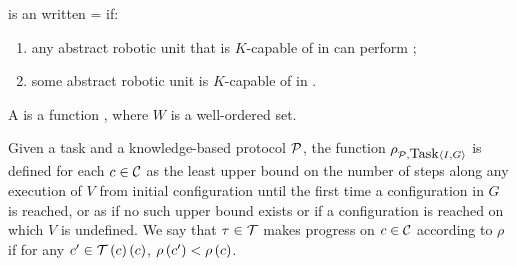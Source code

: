 \begin{defi}
 is an   written = if:
\begin{enumerate}
 \item any abstract robotic unit that is $K$-capable of  in  can perform ;
 \item some abstract robotic unit is $K$-capable of  in .
\end{enumerate}
\cite{conf/ijcai/BrafmanS95}
\end{defi}

\begin{defi}
A   is a function , where $W$ is a well-ordered set.
\cite{conf/ijcai/BrafmanS95}
\end{defi}

\begin{defi}
Given a task  and a knowledge-based protocol $\mathcal{P}$, the function $\rho_{\mathcal{P},\mbox{Task}\left\langle I,G\right\rangle}$ is defined for each $c\in\mathcal{C}$ as the least upper bound on the number of steps along any execution of $V$ from initial configuration  until the first time a configuration in $G$ is reached, or as if no such upper bound exists or if a configuration is reached on which $V$ is undefined. We say that $\tau\in\mathcal{T}$ makes progress on $c\in\mathcal{C}$ according to $\rho$ if for any $c'\in\mathcal{T}\left(c\right)\left( c\right)$, $\rho\left(c'\right)<\rho\left(c\right)$.
\cite{conf/ijcai/BrafmanS95}
\end{defi}
